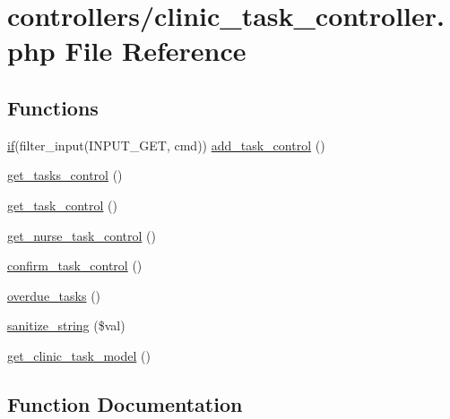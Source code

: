 \hypertarget{clinic__task__controller_8php}{}\section{controllers/clinic\+\_\+task\+\_\+controller.php File Reference}
\label{clinic__task__controller_8php}
\subsection*{Functions}
\begin{DoxyCompactItemize}
\item 
\hyperlink{ec2c8835c9f9fbb7b8cd36464b491e73_8js_ad1eade1809460358d53dba6e1c599a79}{if}(filter\+\_\+input(I\+N\+P\+U\+T\+\_\+\+G\+E\+T, \textquotesingle{}cmd\textquotesingle{})) \hyperlink{clinic__task__controller_8php_a17aca2a08fd0cf173c8501a56a3defd1}{add\+\_\+task\+\_\+control} ()
\item 
\hyperlink{clinic__task__controller_8php_a4a9a8bef2fe6b7439d117b05aca94e97}{get\+\_\+tasks\+\_\+control} ()
\item 
\hyperlink{clinic__task__controller_8php_aa7808eb2ba0e055e0f6769d26e7b08e3}{get\+\_\+task\+\_\+control} ()
\item 
\hyperlink{clinic__task__controller_8php_ae8139eaebf065bf36531c8529ad99840}{get\+\_\+nurse\+\_\+task\+\_\+control} ()
\item 
\hyperlink{clinic__task__controller_8php_af17351df47df98ffb0b4ec039499dfff}{confirm\+\_\+task\+\_\+control} ()
\item 
\hyperlink{clinic__task__controller_8php_ad7a9ae1b2ebca30d9844179f62d4ab6f}{overdue\+\_\+tasks} ()
\item 
\hyperlink{clinic__task__controller_8php_a9868caae1189096380e6af11dfb72d7a}{sanitize\+\_\+string} (\$val)
\item 
\hyperlink{clinic__task__controller_8php_a6409fd9aac8d9eb935389ada0329e59e}{get\+\_\+clinic\+\_\+task\+\_\+model} ()
\end{DoxyCompactItemize}


\subsection{Function Documentation}
\hypertarget{clinic__task__controller_8php_a17aca2a08fd0cf173c8501a56a3defd1}{}
